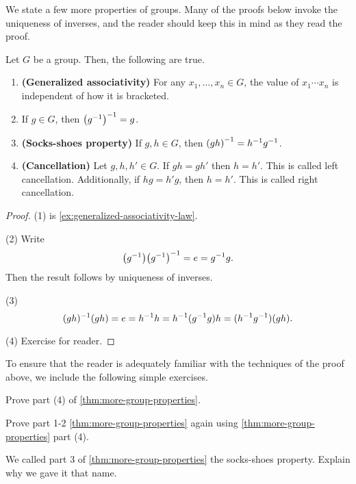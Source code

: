 \documentclass[./main.tex]{subfiles}
\begin{document}
We state a few more properties of groups. Many of the proofs below invoke the
uniqueness of inverses, and the reader should keep this in mind as they read the
proof.
\begin{theorem}
\label{thm:more-group-properties}
    Let $G$ be a group. Then, the following are true.
    \begin{enumerate}
        \item \textbf{(Generalized associativity)} For any $x_1, \dots, x_n \in
        G$, the value of $x_1 \cdots x_n$ is independent of how it is bracketed. 
        \item If $g \in G$, then $\paren{g\inv}\inv = g$.
        \item \textbf{(Socks-shoes property)} If $g, h \in G$, then
        $\paren{gh}\inv = h \inv g \inv$.
        \item \textbf{(Cancellation)} Let $g, h, h' \in G$. If $gh = gh'$ then
        $h = h'$. This is called left cancellation. Additionally, if $hg = h'g$,
        then $h = h'$. This is called right cancellation.
    \end{enumerate}
\end{theorem}
\begin{proof}
    (1) is \cref{ex:generalized-associativity-law}. 

    (2)
    Write
    \[
        \paren{g\inv} \paren{g\inv}\inv = e = g\inv g. 
    \]
    Then the result follows by uniqueness of inverses.

    (3)
    \[
        (gh)^{-1} (gh) = e = h^{-1} h = h ^{-1} (g^{-1} g) h = (h^{-1} g^{-1}) (gh).
    \]

    (4) Exercise for reader.
\end{proof}

To ensure that the reader is adequately familiar with the techniques of the proof above,
we include the following simple exercises. 
\begin{exercise}
\label{exercise:group-cancellation-law}
Prove part (4) of \cref{thm:more-group-properties}.
\end{exercise}

\begin{exercise}
    Prove part 1-2 \cref{thm:more-group-properties} again using \cref{thm:more-group-properties} part (4).
\end{exercise}

\begin{exercise}
    We called part 3 of \cref{thm:more-group-properties} the socks-shoes
    property. Explain why we gave it that name. 
\end{exercise}
\end{document}
